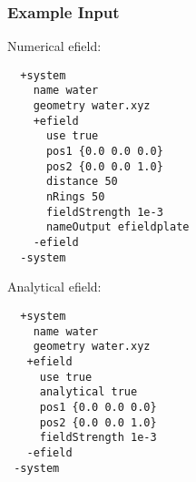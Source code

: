 \subsubsection{Example Input}
Numerical efield:
\begin{lstlisting}
  +system
    name water 
    geometry water.xyz
    +efield
      use true
      pos1 {0.0 0.0 0.0}
      pos2 {0.0 0.0 1.0}
      distance 50
      nRings 50
      fieldStrength 1e-3
      nameOutput efieldplate
    -efield
  -system
 \end{lstlisting}
Analytical efield:
\begin{lstlisting}
  +system
    name water 
    geometry water.xyz
   +efield
     use true
     analytical true
     pos1 {0.0 0.0 0.0}
     pos2 {0.0 0.0 1.0}
     fieldStrength 1e-3
   -efield
 -system
\end{lstlisting}
